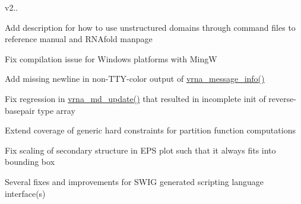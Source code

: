 v2..
\begin{DoxyItemize}
\item Add description for how to use unstructured domains through command files to reference manual and R\+N\+Afold manpage
\item Fix compilation issue for Windows platforms with MingW
\item Add missing newline in non-\/\+T\+T\+Y-\/color output of \mbox{\hyperlink{group__utils_ga039bae6153a6415b054dbe6045f83d03}{vrna\+\_\+message\+\_\+info()}}
\item Fix regression in \mbox{\hyperlink{group__model__details_ga36ae40b8c3b82362f5798ad5b047b814}{vrna\+\_\+md\+\_\+update()}} that resulted in incomplete init of reverse-\/basepair type array
\item Extend coverage of generic hard constraints for partition function computations
\item Fix scaling of secondary structure in E\+PS plot such that it always fits into bounding box
\item Several fixes and improvements for S\+W\+IG generated scripting language interface(s)
\end{DoxyItemize}

